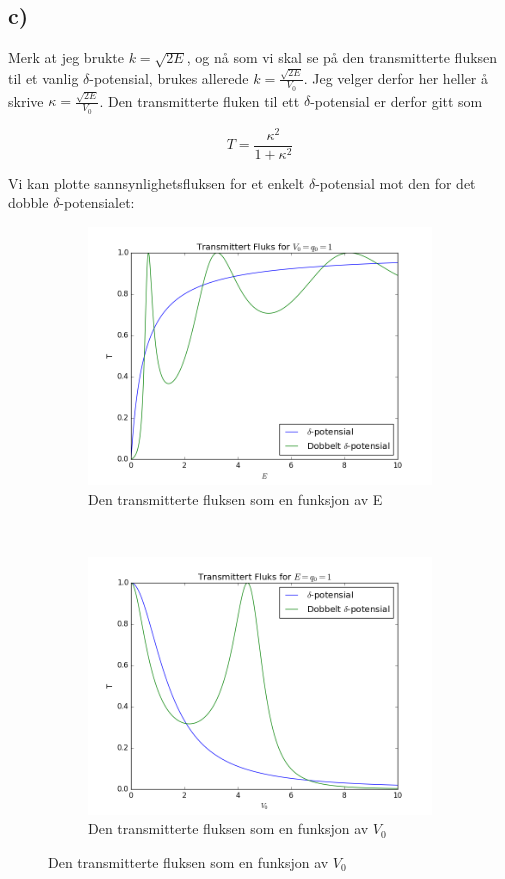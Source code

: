 \documentclass[a4paper,norsk, 10pt]{article}
\numberwithin{equation}{section}
\begin{document}
\newpage
\subsection*{c)}

Merk at jeg brukte $k = \sqrt{2E}$, og nå som vi skal se på den transmitterte fluksen til et vanlig $\delta$-potensial, brukes allerede $k = \frac{\sqrt{2E}}{V_0}$. Jeg velger derfor her heller å skrive $\kappa = \frac{\sqrt{2E}}{V_0}$. Den transmitterte fluken til ett $\delta$-potensial er derfor gitt som

$$
T = \frac{\kappa^2}{1 + \kappa^2}
$$

Vi kan plotte sannsynlighetsfluksen for et enkelt $\delta$-potensial mot den for det dobble $\delta$-potensialet:

\begin{figure}[H]
\centering
\begin{subfigure}{0.3\textwidth}
\centering
\includegraphics[width = \textwidth]{TE.png}
\caption{Den transmitterte fluksen som en funksjon av E}
\label{fig:TE}
\end{subfigure}
~
\begin{subfigure}{0.3\textwidth}
\centering
\includegraphics[width = \textwidth]{TV.png}
\caption{Den transmitterte fluksen som en funksjon av $V_0$}
\end{subfigure}
\end{figure}
\end{document}
